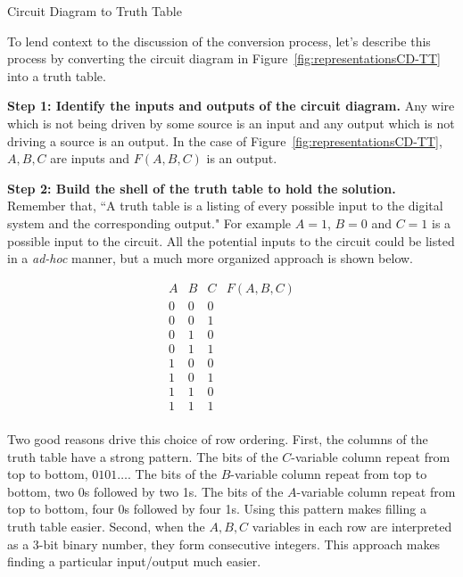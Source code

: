\begin{process}{Circuit Diagram to Truth Table}
\label{process:representationCDtoTT}
\label{page:representationCDtoTT}

To lend context to the discussion of the conversion process, let's describe this
process by converting the circuit diagram in Figure~\ref{fig:representationsCD-TT}
into a truth table.


\textbf{Step 1:  Identify the inputs and outputs of the circuit diagram.}
Any wire which is not being driven by some source is an input and 
any output which is not driving a source is an output.  In the case of 
Figure~\ref{fig:representationsCD-TT}, $A,B,C$ are inputs and $F(A,B,C)$ is an output.


\textbf{Step 2: Build the shell of the truth table to hold the solution. }
Remember that, ``A truth table is a listing of every possible  input to the 
digital system and the corresponding output."  For example $A=1$, $B=0$ and 
$C=1$ is a possible input to the circuit.  All the 
potential inputs to the circuit could be listed in a \textit{ad-hoc} 
manner, but a much more organized approach is shown below.

\label{page:TTshell}
$$\begin{array}{c|c|c||c}
A & B & C & F(A,B,C) \\ \hline \hline
0 & 0 & 0 &   \\ \hline
0 & 0 & 1 &   \\ \hline
0 & 1 & 0 &   \\ \hline
0 & 1 & 1 &   \\ \hline
1 & 0 & 0 &   \\ \hline
1 & 0 & 1 &   \\ \hline
1 & 1 & 0 &   \\ \hline
1 & 1 & 1 &   \\
\end{array}$$

Two good reasons drive this choice of row ordering.
First, the columns of the truth table have a strong pattern.
The bits of the $C$-variable column repeat from top to bottom, $0 1 0 1 \ldots$.
The bits of the $B$-variable column repeat from top to bottom, two 0s followed by two 1s.
The bits of the $A$-variable column repeat from top to bottom, four 0s followed by four 1s.
Using this pattern makes filling a truth table easier.  Second,
when the $A,B,C$ variables in each row are interpreted as a 
3-bit binary number, they form consecutive integers.  This approach
makes finding a particular input/output much easier.


\end{process}
